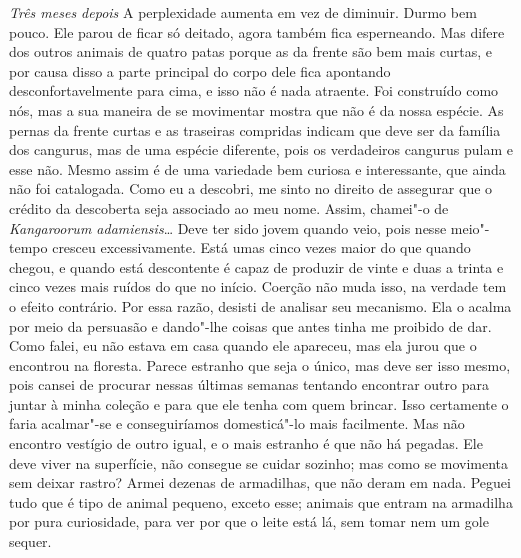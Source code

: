 \textit{Três meses depois} A perplexidade aumenta em vez de diminuir. Durmo bem
pouco. Ele parou de ficar só deitado, agora também fica esperneando. Mas 
difere dos outros animais de quatro patas porque as da frente são bem mais
curtas, e por causa disso a parte principal do corpo dele fica apontando
desconfortavelmente para cima, e isso não é nada atraente. Foi construído
como nós, mas a sua maneira de se movimentar mostra que não é da nossa espécie.
As pernas da frente curtas e as traseiras compridas indicam que deve ser da família
dos cangurus, mas de uma espécie diferente, pois os verdadeiros cangurus pulam
e esse não. Mesmo assim é de uma variedade bem curiosa e interessante, que ainda
não foi catalogada. Como eu a descobri, me sinto no direito de assegurar que o
crédito da descoberta seja associado ao meu nome. Assim, chamei"-o de
\textit{Kangaroorum adamiensis}\ldots{} Deve ter sido jovem quando veio, pois nesse 
meio"-tempo cresceu excessivamente. Está umas cinco vezes maior do que quando chegou,
e quando está descontente é capaz de produzir de vinte e duas a trinta e cinco
vezes mais ruídos do que no início. Coerção não muda isso, na verdade tem o efeito
contrário. Por essa razão, desisti de analisar seu mecanismo. Ela o acalma por
meio da persuasão e dando"-lhe coisas que antes tinha me proibido de dar. Como
falei, eu não estava em casa quando ele apareceu, mas ela jurou que o encontrou
na floresta. Parece estranho que seja o único, mas deve ser isso mesmo, pois 
cansei de procurar nessas últimas semanas tentando encontrar outro para juntar à
minha coleção e para que ele tenha com quem brincar. Isso certamente o
faria acalmar"-se e conseguiríamos domesticá"-lo mais facilmente. Mas não encontro
vestígio de outro igual, e o mais estranho é que não há pegadas. Ele
deve viver na superfície, não consegue se cuidar sozinho; mas como
se movimenta sem deixar rastro? Armei dezenas de armadilhas, que não
deram em nada. Peguei tudo que é tipo de animal pequeno, exceto esse; animais
que entram na armadilha por pura curiosidade, para ver por que o leite está lá,
sem tomar nem um gole sequer. 

